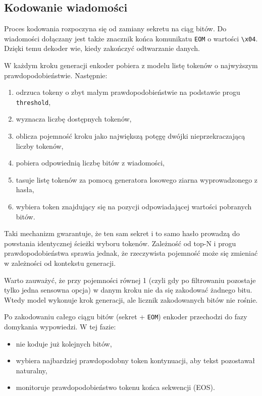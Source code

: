 \documentclass[12pt,a4paper]{article}
\begin{document}
\subsection{Kodowanie wiadomości}
Proces kodowania rozpoczyna się od zamiany sekretu na ciąg bitów. Do wiadomości dołączany jest także znacznik końca komunikatu \texttt{EOM} o wartości \texttt{\textbackslash x04}. Dzięki temu dekoder wie, kiedy zakończyć odtwarzanie danych.

W każdym kroku generacji enkoder pobiera z modelu listę tokenów o najwyższym prawdopodobieństwie. Następnie:
\begin{enumerate}
    \item odrzuca tokeny o zbyt małym prawdopodobieństwie na podstawie progu \texttt{threshold},
    \item wyznacza liczbę dostępnych tokenów,
    \item oblicza pojemność kroku jako największą potęgę dwójki nieprzekraczającą liczby tokenów,
    \item pobiera odpowiednią liczbę bitów z wiadomości,
    \item tasuje listę tokenów za pomocą generatora losowego ziarna wyprowadzonego z hasła,
    \item wybiera token znajdujący się na pozycji odpowiadającej wartości pobranych bitów.
\end{enumerate}

Taki mechanizm gwarantuje, że ten sam sekret i to samo hasło prowadzą do powstania identycznej ścieżki wyboru tokenów. Zależność od top-N i progu prawdopodobieństwa sprawia jednak, że rzeczywista pojemność może się zmieniać w zależności od kontekstu generacji.

Warto zauważyć, że przy pojemności równej 1 (czyli gdy po filtrowaniu pozostaje tylko jedna sensowna opcja) w danym kroku nie da się zakodować żadnego bitu. Wtedy model wykonuje krok generacji, ale licznik zakodowanych bitów nie rośnie.

Po zakodowaniu całego ciągu bitów (sekret + \texttt{EOM}) enkoder przechodzi do fazy domykania wypowiedzi. W tej fazie:
\begin{itemize}
    \item nie koduje już kolejnych bitów,
    \item wybiera najbardziej prawdopodobny token kontynuacji, aby tekst pozostawał naturalny,
    \item monitoruje prawdopodobieństwo tokenu końca sekwencji (EOS).
\end{itemize}
\end{document}
